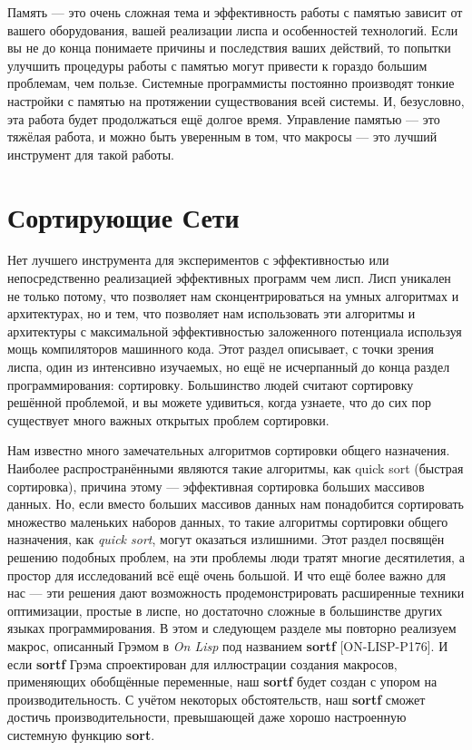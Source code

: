 Память --- это очень сложная тема и эффективность работы с памятью зависит от вашего оборудования, вашей реализации лиспа и особенностей технологий. Если вы не до конца понимаете причины и последствия ваших действий, то попытки улучшить процедуры работы с памятью могут привести к гораздо большим проблемам, чем пользе. Системные программисты постоянно производят тонкие настройки с памятью на протяжении существования всей системы. И, безусловно, эта работа будет продолжаться ещё долгое время. Управление памятью --- это тяжёлая работа, и  можно быть уверенным в том, что макросы --- это лучший инструмент для такой работы.

\section{Сортирующие Сети}\label{sorting_networks}

Нет лучшего инструмента для экспериментов с эффективностью или непосредственно реализацией эффективных программ чем лисп. Лисп уникален не только потому, что позволяет нам сконцентрироваться на умных алгоритмах и архитектурах, но и тем, что позволяет нам использовать эти алгоритмы и архитектуры с максимальной эффективностью заложенного потенциала используя мощь компиляторов машинного кода. Этот раздел описывает, с точки зрения лиспа, один из интенсивно изучаемых, но ещё не исчерпанный до конца раздел программирования: сортировку. Большинство людей считают сортировку решённой проблемой, и вы можете удивиться, когда узнаете, что до сих пор существует много важных открытых проблем сортировки.

Нам известно много замечательных алгоритмов сортировки общего назначения. Наиболее распространёнными являются такие алгоритмы, как quick sort (быстрая сортировка), причина этому --- эффективная сортировка больших массивов данных. Но, если вместо больших массивов данных нам понадобится сортировать множество маленьких наборов данных, то такие алгоритмы сортировки общего назначения, как \emph{quick sort}, могут оказаться излишними. Этот раздел посвящён решению подобных проблем, на эти проблемы люди тратят многие десятилетия, а простор для исследований всё ещё очень большой. И что ещё более важно для нас --- эти решения дают возможность продемонстрировать расширенные техники оптимизации, простые в лиспе, но достаточно сложные в большинстве других языках программирования. В этом и следующем разделе мы повторно реализуем макрос, описанный Грэмом в \emph{On Lisp} под названием \textbf{sortf} [ON-LISP-P176]. И если \textbf{sortf} Грэма спроектирован для иллюстрации создания макросов, применяющих обобщённые переменные, наш \textbf{sortf} будет создан с упором на производительность. С учётом некоторых обстоятельств, наш \textbf{sortf} сможет достичь производительности, превышающей даже хорошо настроенную системную функцию \textbf{sort}.

